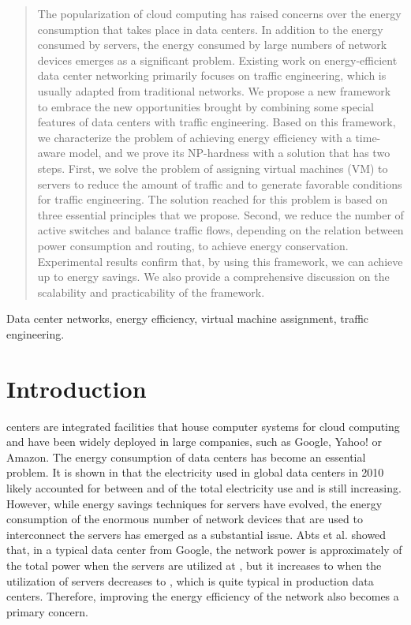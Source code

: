 \documentclass[journal,single-space,two column,twoside,10pt]{IEEEtran}
\begin{document}
\begin{abstract}

The popularization of cloud computing has raised concerns over the energy consumption that takes place in data centers. In addition to the energy consumed by servers, the energy consumed by large numbers of network devices emerges as a significant problem. Existing work on energy-efficient data center networking primarily focuses on traffic engineering, which is usually adapted from traditional networks. We propose a new framework to embrace the new opportunities brought by combining some special features of data centers with traffic engineering. Based on this framework, we characterize the problem of achieving energy efficiency with a time-aware model, and we prove its NP-hardness with a solution that has two steps. First, we solve the problem of assigning virtual machines (VM) to servers to reduce the amount of traffic and to generate favorable conditions for traffic engineering. The solution reached for this problem is based on three essential principles that we propose. Second, we reduce the number of active switches and balance traffic flows, depending on the relation between power consumption and routing, to achieve energy conservation. Experimental results confirm that, by using this framework, we can achieve up to  energy savings. We also provide a comprehensive discussion on the scalability and practicability of the framework.

\end{abstract}

\begin{IEEEkeywords}
Data center networks, energy efficiency, virtual machine assignment, traffic engineering.
\end{IEEEkeywords}

\section{Introduction}
\label{sec:intro}

 centers are integrated facilities that house computer systems for cloud computing and have been widely deployed in large companies, such as Google, Yahoo! or Amazon. The energy consumption of data centers has become an essential problem. It is shown in \cite{Koomey-2011} that the electricity used in global data centers in 2010 likely accounted for between  and  of the total electricity use and is still increasing. However, while energy savings techniques for servers have evolved, the energy consumption of the enormous number of network devices that are used to interconnect the servers has emerged as a substantial issue. Abts et al. \cite{Abts_Marty-2010} showed that, in a typical data center from Google, the network power is approximately   of the total power when the servers are utilized at , but it increases to  when the utilization of servers decreases to , which is quite typical in production data centers. Therefore, improving the energy efficiency of the network also becomes a primary concern.
\end{document}

